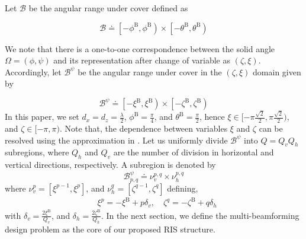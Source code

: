 

Let $\mathcal{B}$ be the angular range under cover defined as

\begin{equation}
    \mathcal{B} \doteq \left[-\phi^{\mathrm{B}}, \phi^{\mathrm{B}}\right)
    \times \left[-\theta^{\mathrm{B}}, \theta^{\mathrm{B}}\right) \label{range_angle}
\end{equation}

We note that there is a one-to-one correspondence between the solid angle $\Omega = (\phi, \psi)$ and its representation after change of variable as $(\zeta, \xi)$. Accordingly, let $\mathcal{B}^{\psi}$ be the angular range under cover in the $(\zeta, \xi)$ domain given by 

\begin{equation}
    \mathcal{B}^\psi \doteq\left[-\xi^{\mathrm{B}}, \xi^{\mathrm{B}}\right) \times\left[-\zeta^{\mathrm{B}}, \zeta^{\mathrm{B}}\right)
\end{equation}
In this paper, we set $d_x = d_z = \frac{\lambda}{2}$, $\phi^{\mathrm{B}} = \frac{\pi}{4}$, and $\theta^{\mathrm{B}} = \frac{\pi}{2}$, hence $\xi \in [-\pi\frac{\sqrt{2}}{2}, \pi\frac{\sqrt{2}}{2})$, and $\zeta \in [-\pi, \pi)$. Note that, the dependence between variables $\xi$ and $\zeta$ can be resolved using the approximation in \cite{Song17}.
Let us uniformly divide $\mathcal{B}^{\psi}$  into $Q=Q_{v} Q_{h}$ subregions, where $Q_h$ and $Q_v$ are the number of division in horizontal and vertical directions, respectively. A subregion is denoted by  
$$ \mathcal{B}^{\psi}_{ p, q} \doteq \nu_{v}^{p, q} \times \nu_{h}^ {p, q}$$
\noindent where $\nu_{v}^{p} = [\xi^{p-1}, \xi^{p}]$, and $\nu_{h}^{q} = [\zeta^{q-1}, \zeta^{q}]$ defining,
\begin{align}
    & \xi^{p} = -\xi^{\mathrm{B}} + p\delta_v, \quad \zeta^{q} = -\zeta^{\mathrm{B}} + q\delta_h
\end{align}
\noindent with $\delta_v = \frac{2\xi^{\mathrm{B}}}{Q_v}$, and $\delta_h = \frac{2\zeta^{\mathrm{B}}}{Q_h}$. In the next section, we define the multi-beamforming design problem as the core of our proposed RIS structure. 


